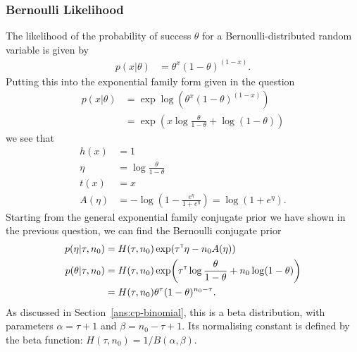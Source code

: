 \documentclass[a4paper]{article}
\theoremstyle{definition}
\begin{document}
\subsubsection{Bernoulli Likelihood}
The likelihood of the probability of success $\theta$ for a Bernoulli-distributed random variable is given by
\begin{align}
p( x | \theta) &= \theta^x ( 1 - \theta )^{( 1 - x )}.
\end{align}
Putting this into the exponential family form given in the question
\begin{align}
p( x | \theta) &= \exp  \log \left( \theta^x ( 1 - \theta )^{( 1 - x )} \right) \\
&= \exp  \left( x\log \frac{ \theta }{ 1 - \theta } + \log ( 1 - \theta ) \right)
\end{align}
we see that
\begin{align}
h(x) &= 1 \\
\eta &= \log \frac{ \theta }{ 1 - \theta } \\
t(x) &= x \\
A( \eta ) &= -\log \left( 1 - \frac{ e^\eta }{ 1 + e^\eta } \right) = \log ( 1 + e^\eta ).
\end{align}
Starting from the general exponential family conjugate prior we have shown in the previous question, we can find the Bernoulli conjugate prior
\begin{align}
p(\eta | \tau, n_0) &= H( \tau, n_0 ) \exp\left( \tau\transpose \eta - n_0 A(\eta) \right) \\
p(\theta | \tau, n_0)  &= H( \tau, n_0 ) \exp\left( \tau\transpose \log \frac{ \theta }{ 1 - \theta } + n_0 \log ( 1 - \theta ) \right) \\
&= H( \tau, n_0 ) \theta ^ \tau ( 1 - \theta ) ^ {n_0 - \tau}.
\end{align}
As discussed in Section~\ref{ans:cp-binomial}, this is a beta distribution, with parameters $\alpha=\tau + 1$ and $\beta=n_0-\tau + 1$. Its normalising constant is defined by the beta function: $H( \tau, n_0 )=1/B(\alpha,\beta)$.
\end{document}
